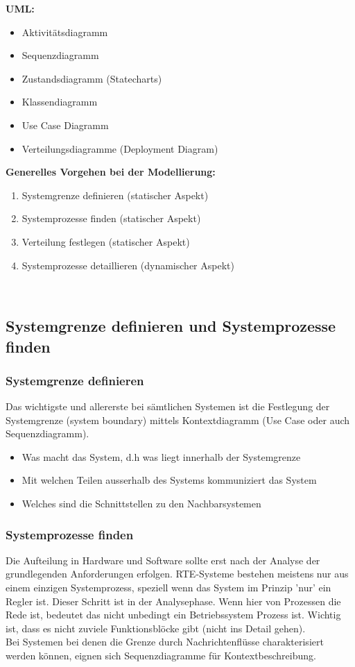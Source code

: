 \begin{multicols}{2}
	\textbf{UML:}
	\begin{itemize}
		\item Aktivitätsdiagramm
		\item Sequenzdiagramm
		\item Zustandsdiagramm (Statecharts)
		\item Klassendiagramm
		\item Use Case Diagramm
		\item Verteilungsdiagramme (Deployment Diagram)
	\end{itemize}
	\columnbreak
	
	\textbf{Generelles Vorgehen bei der Modellierung:}
	\begin{enumerate}
		\item Systemgrenze definieren (statischer Aspekt)
		\item Systemprozesse finden (statischer Aspekt)
		\item Verteilung festlegen (statischer Aspekt)
		\item Systemprozesse detaillieren (dynamischer Aspekt)
	\end{enumerate} \ \\
\end{multicols}

\subsection{Systemgrenze definieren und Systemprozesse finden}
\subsubsection{Systemgrenze definieren}
Das wichtigste und allererste bei sämtlichen Systemen ist die Festlegung der Systemgrenze (system boundary) mittels Kontextdiagramm (Use Case oder auch Sequenzdiagramm).
\begin{itemize}
	\item Was macht das System, d.h was liegt innerhalb der Systemgrenze
	\item Mit welchen Teilen ausserhalb des Systems kommuniziert das System
	\item Welches sind die Schnittstellen zu den Nachbarsystemen
\end{itemize}

\subsubsection{Systemprozesse finden}
Die Aufteilung in Hardware und Software sollte erst nach der Analyse der grundlegenden Anforderungen erfolgen.
RTE-Systeme bestehen meistens nur aus einem einzigen Systemprozess, speziell wenn das System im Prinzip 'nur' ein
Regler ist. Dieser Schritt ist in der Analysephase. Wenn hier von Prozessen die Rede ist, bedeutet das nicht unbedingt ein
Betriebssystem Prozess ist. Wichtig ist, dass es nicht zuviele Funktionsblöcke gibt (nicht ins Detail gehen). \\
Bei Systemen bei denen die Grenze durch Nachrichtenflüsse charakterisiert werden können, eignen sich Sequenzdiagramme
für Kontextbeschreibung.\\

